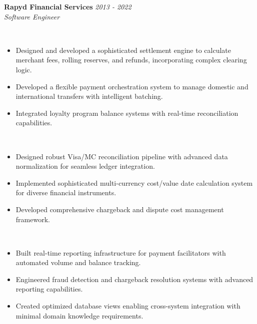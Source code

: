 \documentclass[a4paper,10pt]{article}
\newcommand{\workentry}[4]{%
  \noindent
  {\headingfont\large\textbf{#1}} \hfill {\small\textit{#2}}\\[0.1cm]     
  {\small\textit{#3}}\\[0.1cm]
  #4
  \vspace{0.3cm}
}
\begin{document}
\workentry{Rapyd Financial Services}{2013 - 2022}{Software Engineer}{
\begin{description}[
  leftmargin=1em,
  labelwidth=0pt,
  itemindent=0pt,
  listparindent=0pt,
  parsep=0.1cm,    %
  itemsep=0.1cm    %
]
\vspace{-0.4cm}  %

  \item[\textbf{Payment Processing \& Settlement}]\mbox{}\\ %
  \vspace{-0.4cm}  %
    \begin{itemize}[leftmargin=1em, topsep=0pt]
      \item Designed and developed a sophisticated settlement engine to calculate merchant fees, rolling reserves, and refunds, incorporating complex clearing logic.
      \item Developed a flexible payment orchestration system to manage domestic and international transfers with intelligent batching.
      \item Integrated loyalty program balance systems with real-time reconciliation capabilities.
    \end{itemize}
  \item[\textbf{Financial Systems Integration}]\mbox{}\\
  \vspace{-0.4cm}
    \begin{itemize}[leftmargin=1em, topsep=0pt]
      \item Designed robust Visa/MC reconciliation pipeline with advanced data normalization for seamless ledger integration.
      \item Implemented sophisticated multi-currency cost/value date calculation system for diverse financial instruments.
      \item Developed comprehensive chargeback and dispute cost management framework.
    \end{itemize}
  \item[\textbf{Reporting \& Risk Management}]\mbox{}\\
  \vspace{-0.4cm}
    \begin{itemize}[leftmargin=1em, topsep=0pt]
      \item Built real-time reporting infrastructure for payment facilitators with automated volume and balance tracking.
      \item Engineered fraud detection and chargeback resolution systems with advanced reporting capabilities.
      \item Created optimized database views enabling cross-system integration with minimal domain knowledge requirements.
    \end{itemize}
 

\end{description}}
\end{document}

